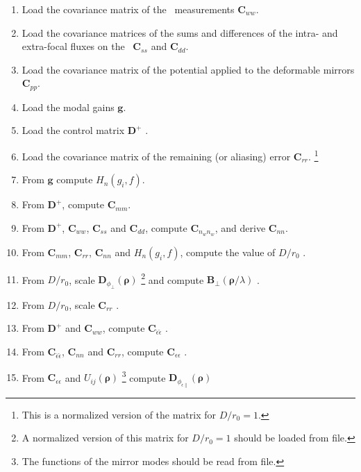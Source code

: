 \documentclass[a4paper]{article}
\begin{document}
\begin{enumerate}
\item Load the covariance matrix of the \WFS\ measurements
      $\mathbf{C}_{ww}$.
\item Load the covariance matrices of the sums and differences of the intra-
      and extra-focal fluxes on the \WFS\ $\mathbf{C}_{ss}$ and
      $\mathbf{C}_{dd}$. 
\item Load the covariance matrix of the potential applied to the deformable
      mirrors $\mathbf{C}_{pp}$.
\item Load the modal gains $\mathbf{g}$.
\item Load the control matrix $\mathbf{D}^+$ \cite[eq.~16]{veran}.
\item Load the covariance matrix of the remaining (or aliasing) error
      $\mathbf{C}_{rr}$.%
      \footnote{This is a normalized version of the matrix for $D/r_0=1$.}
\item From $\mathbf{g}$ compute $H_n(g_i,f)$. 
\item From $\mathbf{D}^+$, compute $\mathbf{C}_{mm}$.
\item From $\mathbf{D}^+$, $\mathbf{C}_{ww}$, $\mathbf{C}_{ss}$ and
      $\mathbf{C}_{dd}$, compute $\mathbf{C}_{n_w n_w}$, and derive
      $\mathbf{C}_{nn}$.
\item From $\mathbf{C}_{mm}$, $\mathbf{C}_{rr}$, $\mathbf{C}_{nn}$ and
      $H_n(g_i,f)$, compute the value of $D/r_0$ \cite[sect.~3.2.3]{veran}.
\item From $D/r_0$, scale
      $\mathbf{D}_{\phi_\perp}(\boldsymbol{\rho})$%
      \footnote{A normalized version of this matrix for $D/r_0 = 1$ should be
                loaded from file.}
      \cite[eq.~45]{veran} and compute 
      $\mathbf{B}_{\perp}(\boldsymbol{\rho}/\lambda)$ \cite[eq.~33]{veran}.
\item From $D/r_0$, scale $\mathbf{C}_{rr}$ \cite[eq.~46]{veran}.
\item From $\mathbf{D}^+$ and $\mathbf{C}_{ww}$, compute
      $\mathbf{C}_{\hat{\epsilon}\hat{\epsilon}}$ \cite[eq.~41]{veran}.
\item From $\mathbf{C}_{\hat{\epsilon}\hat{\epsilon}}$, $\mathbf{C}_{nn}$ and
      $\mathbf{C}_{rr}$, compute $\mathbf{C}_{\epsilon \epsilon}$
      \cite[eq.~44]{veran}. 
\item From $\mathbf{C}_{\epsilon\epsilon}$ and $U_{ij}(\boldsymbol{\rho})$%
      \footnote{The functions of the mirror modes should be read from file.}
      compute $\mathbf{D}_{\phi_{\epsilon\parallel}}(\boldsymbol{\rho})$

\end{enumerate}
\end{document}

